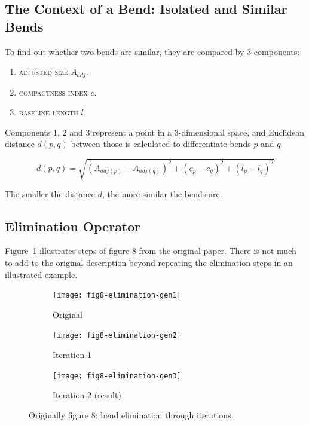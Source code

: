 \documentclass[a4paper]{article}
\begin{document}
\subsection{The Context of a Bend: Isolated and Similar Bends}

To find out whether two bends are similar, they are compared by 3 components:

\begin{enumerate}
  \item \textsc{adjusted size} $A_{adj}$.
  \item \textsc{compactness index} $c$.
  \item \textsc{baseline length} $l$.
\end{enumerate}

Components 1, 2 and 3 represent a point in a 3-dimensional space, and Euclidean
distance $d(p,q)$ between those is calculated to differentiate bends $p$ and
$q$:

\[
  d(p,q) = \sqrt{(A_{adj(p)}-A_{adj(q)})^2 +
                   (c_p-c_q)^2 +
                   (l_p-l_q)^2}
\]

The smaller the distance $d$, the more similar the bends are.

\subsection{Elimination Operator}

Figure~\ref{fig:elimination-through-iterations} illustrates steps of figure 8
from the original paper. There is not much to add to the original description
beyond repeating the elimination steps in an illustrated example.

\begin{figure}[ht]
    \centering
    \begin{subfigure}[b]{.7\textwidth}
        \texttt{[image: fig8-elimination-gen1]}
        \caption{Original}
    \end{subfigure}
    \begin{subfigure}[b]{.7\textwidth}
        \texttt{[image: fig8-elimination-gen2]}
        \caption{Iteration 1}
    \end{subfigure}
    \begin{subfigure}[b]{.7\textwidth}
        \texttt{[image: fig8-elimination-gen3]}
        \caption{Iteration 2 (result)}
    \end{subfigure}
    \caption{Originally figure 8: bend elimination through iterations.}
    \label{fig:elimination-through-iterations}
\end{figure}
\end{document}
